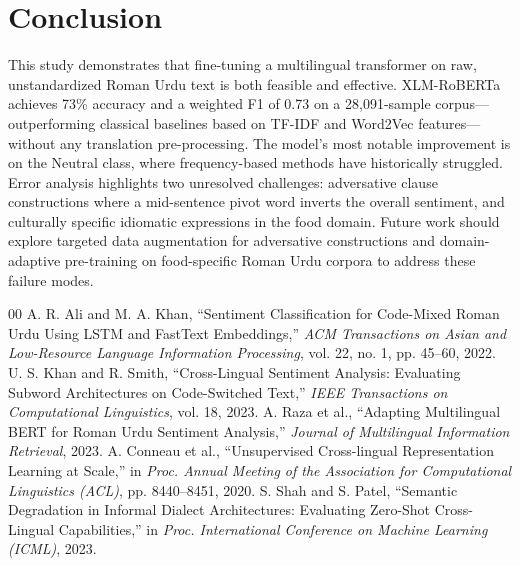 \documentclass[conference]{IEEEtran}
\begin{document}
\section{Conclusion}
This study demonstrates that fine-tuning a multilingual transformer on raw, unstandardized Roman Urdu text is both feasible and effective. XLM-RoBERTa achieves 73\% accuracy and a weighted F1 of 0.73 on a 28,091-sample corpus---outperforming classical baselines based on TF-IDF and Word2Vec features---without any translation pre-processing. The model's most notable improvement is on the Neutral class, where frequency-based methods have historically struggled. Error analysis highlights two unresolved challenges: adversative clause constructions where a mid-sentence pivot word inverts the overall sentiment, and culturally specific idiomatic expressions in the food domain. Future work should explore targeted data augmentation for adversative constructions and domain-adaptive pre-training on food-specific Roman Urdu corpora to address these failure modes.

\begin{thebibliography}{00}
 A. R. Ali and M. A. Khan, ``Sentiment Classification for Code-Mixed Roman Urdu Using LSTM and FastText Embeddings,'' \textit{ACM Transactions on Asian and Low-Resource Language Information Processing}, vol. 22, no. 1, pp. 45--60, 2022.
 U. S. Khan and R. Smith, ``Cross-Lingual Sentiment Analysis: Evaluating Subword Architectures on Code-Switched Text,'' \textit{IEEE Transactions on Computational Linguistics}, vol. 18, 2023.
 A. Raza et al., ``Adapting Multilingual BERT for Roman Urdu Sentiment Analysis,'' \textit{Journal of Multilingual Information Retrieval}, 2023.
 A. Conneau et al., ``Unsupervised Cross-lingual Representation Learning at Scale,'' in \textit{Proc. Annual Meeting of the Association for Computational Linguistics (ACL)}, pp. 8440--8451, 2020.
 S. Shah and S. Patel, ``Semantic Degradation in Informal Dialect Architectures: Evaluating Zero-Shot Cross-Lingual Capabilities,'' in \textit{Proc. International Conference on Machine Learning (ICML)}, 2023.
\end{thebibliography}
\end{document}

